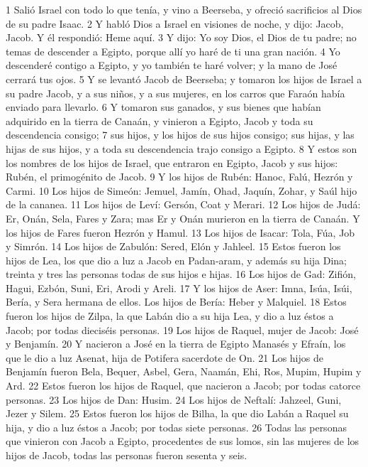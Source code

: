 1 Salió Israel con todo lo que tenía, y vino a Beerseba, y ofreció sacrificios al Dios de su padre Isaac.
2 Y habló Dios a Israel en visiones de noche, y dijo: Jacob, Jacob. Y él respondió: Heme aquí.
3 Y dijo: Yo soy Dios, el Dios de tu padre; no temas de descender a Egipto, porque allí yo haré de ti una gran nación.
4 Yo descenderé contigo a Egipto, y yo también te haré volver; y la mano de José cerrará tus ojos.
5 Y se levantó Jacob de Beerseba; y tomaron los hijos de Israel a su padre Jacob, y a sus niños, y a sus mujeres, en los carros que Faraón había enviado para llevarlo.
6 Y tomaron sus ganados, y sus bienes que habían adquirido en la tierra de Canaán, y vinieron a Egipto, Jacob y toda su descendencia consigo;
7 sus hijos, y los hijos de sus hijos consigo; sus hijas, y las hijas de sus hijos, y a toda su descendencia trajo consigo a Egipto.
8 Y estos son los nombres de los hijos de Israel, que entraron en Egipto, Jacob y sus hijos: Rubén, el primogénito de Jacob.
9 Y los hijos de Rubén: Hanoc, Falú, Hezrón y Carmi.
10 Los hijos de Simeón: Jemuel, Jamín, Ohad, Jaquín, Zohar, y Saúl hijo de la cananea.
11 Los hijos de Leví: Gersón, Coat y Merari.
12 Los hijos de Judá: Er, Onán, Sela, Fares y Zara; mas Er y Onán murieron en la tierra de Canaán. Y los hijos de Fares fueron Hezrón y Hamul.
13 Los hijos de Isacar: Tola, Fúa, Job y Simrón.
14 Los hijos de Zabulón: Sered, Elón y Jahleel.
15 Estos fueron los hijos de Lea, los que dio a luz a Jacob en Padan-aram, y además su hija Dina; treinta y tres las personas todas de sus hijos e hijas.
16 Los hijos de Gad: Zifión, Hagui, Ezbón, Suni, Eri, Arodi y Areli.
17 Y los hijos de Aser: Imna, Isúa, Isúi, Bería, y Sera hermana de ellos. Los hijos de Bería: Heber y Malquiel.
18 Estos fueron los hijos de Zilpa, la que Labán dio a su hija Lea, y dio a luz éstos a Jacob; por todas dieciséis personas.
19 Los hijos de Raquel, mujer de Jacob: José y Benjamín.
20 Y nacieron a José en la tierra de Egipto Manasés y Efraín, los que le dio a luz Asenat, hija de Potifera sacerdote de On.
21 Los hijos de Benjamín fueron Bela, Bequer, Asbel, Gera, Naamán, Ehi, Ros, Mupim, Hupim y Ard.
22 Estos fueron los hijos de Raquel, que nacieron a Jacob; por todas catorce personas.
23 Los hijos de Dan: Husim.
24 Los hijos de Neftalí: Jahzeel, Guni, Jezer y Silem.
25 Estos fueron los hijos de Bilha, la que dio Labán a Raquel su hija, y dio a luz éstos a Jacob; por todas siete personas.
26 Todas las personas que vinieron con Jacob a Egipto, procedentes de sus lomos, sin las mujeres de los hijos de Jacob, todas las personas fueron sesenta y seis.
